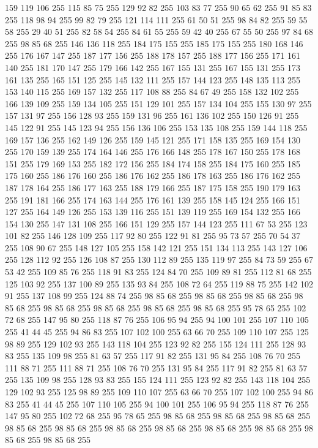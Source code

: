 159 119 106 255 115 85 75 255 129 92 82 255 103 83 77 255 90 65 62 255 91 85 83 255 118 98 94 255 99 82 79 255 121 114 111 255 61 50 51 255 98 84 82 255 59 55 58 255 29 40 51 255 82 58 54 255 84 61 55 255 59 42 40 255 67 55 50 255 97 84 68 255 98 85 68 255 146 136 118 255 184 175 155 255 185 175 155 255 180 168 146 255 176 167 147 255 187 177 156 255 188 178 157 255 188 177 156 255 171 161 140 255 181 170 147 255 179 166 142 255 167 155 131 255 167 155 131 255 173 161 135 255 165 151 125 255 145 132 111 255 157 144 123 255 148 135 113 255 153 140 115 255 169 157 132 255 117 108 88 255 84 67 49 255 158 132 102 255 166 139 109 255 159 134 105 255 151 129 101 255 157 134 104 255 155 130 97 255 157 131 97 255 156 128 93 255 159 131 96 255 161 136 102 255 150 126 91 255 145 122 91 255 145 123 94 255 156 136 106 255 153 135 108 255 159 144 118 255 169 157 136 255 162 149 126 255 159 145 121 255 171 158 135 255 169 154 130 255 170 159 139 255 174 164 146 255
176 166 148 255 178 167 150 255 178 168 151 255 179 169 153 255 182 172 156 255 184 174 158 255 184 175 160 255 185 175 160 255 186 176 160 255 186 176 162 255 186 178 163 255 186 176 162 255 187 178 164 255 186 177 163 255 188 179 166 255 187 175 158 255 190 179 163 255 191 181 166 255 174 163 144 255 176 161 139 255 158 145 124 255 166 151 127 255 164 149 126 255 153 139 116 255 151 139 119 255 169 154 132 255 166 154 130 255 147 131 108 255 166 151 129 255 157 144 123 255 111 67 53 255 123 101 82 255 146 128 109 255 117 92 80 255 122 91 81 255 95 73 57 255 70 54 37 255 108 90 67 255 148 127 105 255 158 142 121 255 151 134 113 255 143 127 106 255 128 112 92 255 126 108 87 255 130 112 89 255 135 119 97 255 84 73 59 255 67 53 42 255 109 85 76 255 118 91 83 255 124 84 70 255 109 89 81 255 112 81 68 255 125 103 92 255 137 100 89 255 135 93 84 255 108 72 64 255 119 88 75 255 142 102 91 255 137 108 99 255 124 88 74 255 98 85 68 255 98 85 68 255 98 85 68 255
98 85 68 255 98 85 68 255 98 85 68 255 98 85 68 255 98 85 68 255 95 78 65 255 102 72 68 255 147 95 80 255 118 87 76 255 106 95 94 255 94 100 101 255 107 110 105 255 41 44 45 255 94 86 83 255 107 102 100 255 63 66 70 255 109 110 107 255 125 98 89 255 129 102 93 255 143 118 104 255 123 92 82 255 155 124 111 255 128 93 83 255 135 109 98 255 81 63 57 255 117 91 82 255 131 95 84 255 108 76 70 255 111 88 71 255 111 88 71 255 108 76 70 255 131 95 84 255 117 91 82 255 81 63 57 255 135 109 98 255 128 93 83 255 155 124 111 255 123 92 82 255 143 118 104 255 129 102 93 255 125 98 89 255 109 110 107 255 63 66 70 255 107 102 100 255 94 86 83 255 41 44 45 255 107 110 105 255 94 100 101 255 106 95 94 255 118 87 76 255 147 95 80 255 102 72 68 255 95 78 65 255 98 85 68 255 98 85 68 255 98 85 68 255 98 85 68 255 98 85 68 255 98 85 68 255 98 85 68 255 98 85 68 255 98 85 68 255 98 85 68 255 98 85 68 255
